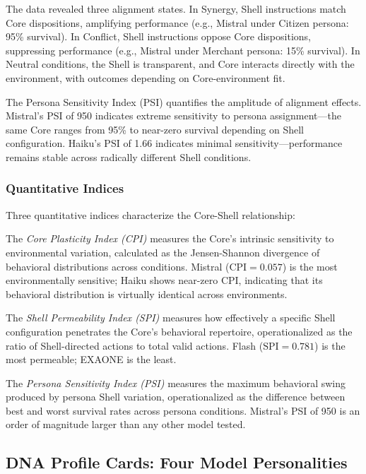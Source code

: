 \documentclass[11pt]{article}
\begin{document}
The data revealed three alignment states. In Synergy, Shell instructions match Core dispositions, amplifying performance (e.g., Mistral under Citizen persona: 95\% survival). In Conflict, Shell instructions oppose Core dispositions, suppressing performance (e.g., Mistral under Merchant persona: 15\% survival). In Neutral conditions, the Shell is transparent, and Core interacts directly with the environment, with outcomes depending on Core-environment fit.

The Persona Sensitivity Index (PSI) quantifies the amplitude of alignment effects. Mistral's PSI of 950 indicates extreme sensitivity to persona assignment---the same Core ranges from 95\% to near-zero survival depending on Shell configuration. Haiku's PSI of 1.66 indicates minimal sensitivity---performance remains stable across radically different Shell conditions.

\subsubsection{Quantitative Indices}

Three quantitative indices characterize the Core-Shell relationship:

The \emph{Core Plasticity Index (CPI)} measures the Core's intrinsic sensitivity to environmental variation, calculated as the Jensen-Shannon divergence of behavioral distributions across conditions. Mistral ($\text{CPI}=0.057$) is the most environmentally sensitive; Haiku shows near-zero CPI, indicating that its behavioral distribution is virtually identical across environments.

The \emph{Shell Permeability Index (SPI)} measures how effectively a specific Shell configuration penetrates the Core's behavioral repertoire, operationalized as the ratio of Shell-directed actions to total valid actions. Flash ($\text{SPI}=0.781$) is the most permeable; EXAONE is the least.

The \emph{Persona Sensitivity Index (PSI)} measures the maximum behavioral swing produced by persona Shell variation, operationalized as the difference between best and worst survival rates across persona conditions. Mistral's PSI of 950 is an order of magnitude larger than any other model tested.

\subsection{DNA Profile Cards: Four Model Personalities}
\end{document}
